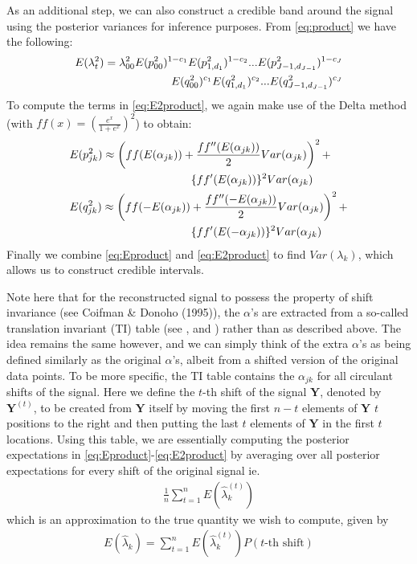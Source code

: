 \documentclass[12pt]{article}
\newcommand{\Ga}{\alpha}
\newcommand{\Gl}{\lambda}    \newcommand{\GL}{\Lambda}
\begin{document}
\begin{appendices}
As an additional step, we can also construct a credible band around the signal using the posterior variances for inference purposes. From \eqref{eq:product} we have the following:
\begin{eqnarray}\label{eq:E2product}E(\Gl_t^2)=\Gl_{00}^2E(p_{00}^2)^{1-c_1}E(p_{1,d_1}^2)^{1-c_2}...E(p_{J-1,d_{J-1}}^2)^{1-c_J}\notag\\
E(q_{00}^2)^{c_1}E(q_{1,d_1}^2)^{c_2}...E(q_{J-1,d_{J-1}}^2)^{c_J}\end{eqnarray}
To compute the terms in \eqref{eq:E2product}, we again make use of the Delta method (with $ff(x)=(\frac{e^x}{1+e^x})^2$) to obtain:
\begin{eqnarray}
&E(p_{jk}^2)\approx \left(ff(E(\Ga_{jk}))+\frac{ff''(E(\Ga_{jk}))}{2}Var(\Ga_{jk})\right)^2+\notag\\
& \hspace{1.5 in}\{ff'(E(\Ga_{jk}))\}^2Var(\Ga_{jk})\\
&E(q_{jk}^2)\approx \left(ff(-E(\Ga_{jk}))+\frac{ff''(-E(\Ga_{jk}))}{2}Var(\Ga_{jk})\right)^2+\notag\\
& \hspace{1.5 in}\{ff'(E(-\Ga_{jk}))\}^2Var(\Ga_{jk})
\end{eqnarray}
Finally we combine \eqref{eq:Eproduct} and \eqref{eq:E2product} to find $Var(\Gl_k)$, which allows us to construct credible intervals.

Note here that for the reconstructed signal to possess the property of shift invariance (see Coifman \& Donoho (1995)), the $\Ga$'s are extracted from a so-called translation invariant (TI) table (see \cite{Coifman1995Translationinvariant}, and \cite{Kolaczyk1999Multiscale}) rather than as described above. The idea remains the same however, and we can simply think of the extra $\Ga$'s as being defined similarly as the original $\Ga$'s, albeit from a shifted version of the original data points. To be more specific, the TI table contains the $\Ga_{jk}$ for all circulant shifts of the signal. Here we define the $t$-th shift of the signal $\bm{Y}$, denoted by $\bm{Y}^{(t)}$, to be created from $\bm{Y}$ itself by moving the first $n-t$ elements of $\bm{Y}$ $t$ positions to the right and then putting the last $t$ elements of $\bm{Y}$ in the first $t$ locations. Using this table, we are essentially computing the posterior expectations in \eqref{eq:Eproduct}-\eqref{eq:E2product} by averaging over all posterior expectations for every shift of the original signal ie.
\begin{eqnarray}
\label{eq:TIapproxexp}\frac{1}{n}\sum_{t=1}^n E(\hat{\Gl}_k^{(t)})
\end{eqnarray}
which is an approximation to the true quantity we wish to compute, given by
\begin{eqnarray}
E(\hat{\Gl}_k)=\sum_{t=1}^n E(\hat{\Gl}_k^{(t)})P(\mbox{$t$-th shift})
\end{eqnarray}
\end{appendices}



\end{document}
